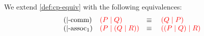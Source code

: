 \begin{definition}\label{def:nc-equiv}
  We extend \cref{def:cp-equiv} with the following equivalences:
  \[
    \begin{array}{llll}
      (|\text{-comm})
      & \textcolor{red}{(P \mid Q)}
      & \equiv \;
      & \textcolor{red}{(Q \mid P)}
      \\
      (|\text{-assoc}_1)
      & \textcolor{red}{(P \mid (Q \mid R))}
      & \equiv \;
      & \textcolor{red}{((P \mid Q) \mid R)}
    \end{array}
  \]
\end{definition} 
